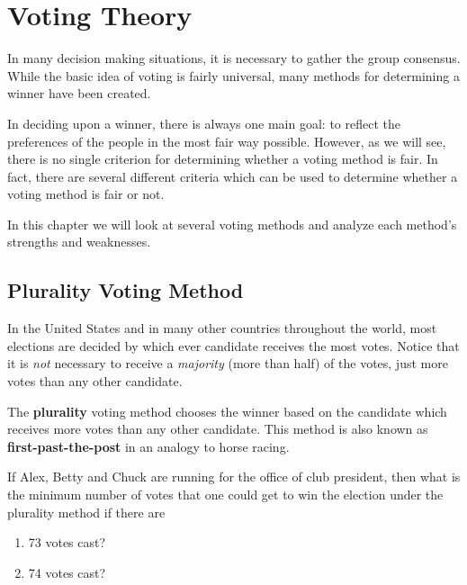 \chapter{Voting Theory}%
\label{chap:voting-theory}

In many decision making situations, it is necessary to gather the
group consensus. While the basic idea of voting is fairly universal,
many methods for determining a winner have been created.

In deciding upon a winner, there is always one main goal: to reflect
the preferences of the people in the most fair way possible. However,
as we will see, there is no single criterion for determining whether a
voting method is fair. In fact, there are several different criteria
which can be used to determine whether a voting method is fair or not.

In this chapter we will look at several voting methods and analyze
each method's strengths and weaknesses.

\section{Plurality Voting Method}%
\label{sec:plurality-method}

In the United States and in many other countries throughout the world,
most elections are decided by which ever candidate receives the most
votes. Notice that it is \emph{not} necessary to receive a
\emph{majority} (more than half) of the votes, just more votes than
any other candidate.

\begin{definition}
  The \textbf{plurality} voting method chooses the winner based on the
  candidate which receives more votes than any other candidate. This
  method is also known as \textbf{first-past-the-post} in an analogy
  to horse racing.
\end{definition}

\begin{exercise}
  If Alex, Betty and Chuck are running for the office of club
  president, then what is the minimum number of votes that one could
  get to win the election under the plurality method if there are
  \begin{enumerate}
  \item 73 votes cast?
  \item 74 votes cast?
  \end{enumerate}
\end{exercise}

